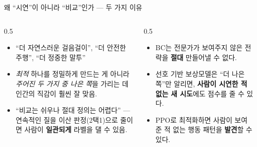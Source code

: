 \documentclass[aspectratio=169,11pt]{beamer}
\begin{document}
\begin{frame}{왜 ``시연''이 아니라 ``비교''인가 — 두 가지 이유}
  \begin{columns}[T]
    \begin{column}{0.5\textwidth}
      \begin{itemize}
        \item ``더 자연스러운 걸음걸이'', ``더 안전한 주행'',
          ``더 정중한 말투''
        \item \textit{최적} 하나를 정밀하게 만드는 게 아니라
          \textit{주어진 두 가지 중 나은 쪽}을 가리는 데 인간의
          직감이 훨씬 잘 맞음.
        \item ``비교는 쉬우나 절대 정의는 어렵다'' — 연속적인 질을
          이산 판정(2택1)으로 줄이면 사람이 \textbf{일관되게}
          라벨을 댈 수 있음.
      \end{itemize}
    \end{column}
    \begin{column}{0.5\textwidth}
      \begin{itemize}
        \item BC는 전문가가 보여주지 않은 전략을 \textbf{절대}
          만들어낼 수 없다.
        \item 선호 기반 보상모델은 ``더 나은 쪽''만 알리면,
          \textbf{사람이 시연한 적 없는 새 시도}에도 점수를 줄 수
          있다.
        \item PPO로 최적화하면 사람이 보여준 적 없는 행동 패턴을
          \textbf{발견}할 수 있다.
      \end{itemize}
    \end{column}
  \end{columns}
\end{frame}

\end{document}
